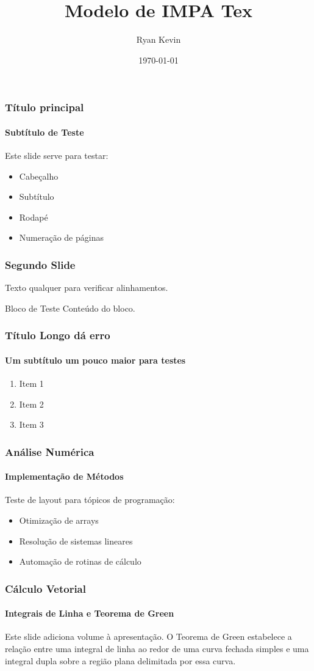 \documentclass[aspectratio=169]{beamer}
\title[IMPA Tex]{Modelo de IMPA Tex}
\author[Ryan Kevin]{Ryan Kevin}
\institute[IMPATECH]{Instituto de Matemática, Pesquisa e Tecnologia}
\date{\today}
\begin{document}
\begin{frame}
    \frametitle{Título principal}
    \framesubtitle{Subtítulo de Teste}

    Este slide serve para testar:

    \begin{itemize}
        \item Cabeçalho
        \item Subtítulo
        \item Rodapé
        \item Numeração de páginas
    \end{itemize}
\end{frame}

\begin{frame}
    \frametitle{Segundo Slide}

    Texto qualquer para verificar alinhamentos.

    \vspace{1cm}

    \begin{block}{Bloco de Teste}
        Conteúdo do bloco.
    \end{block}
\end{frame}

\begin{frame}
    \frametitle{Título Longo dá erro}
    \framesubtitle{Um subtítulo um pouco maior para testes}

    \begin{enumerate}
        \item Item 1
        \item Item 2
        \item Item 3
    \end{enumerate}
\end{frame}

\begin{frame}
    \frametitle{Análise Numérica}
    \framesubtitle{Implementação de Métodos}
    
    Teste de layout para tópicos de programação:
    \begin{itemize}
        \item Otimização de arrays
        \item Resolução de sistemas lineares
        \item Automação de rotinas de cálculo
    \end{itemize}
\end{frame}

\begin{frame}
    \frametitle{Cálculo Vetorial}
    \framesubtitle{Integrais de Linha e Teorema de Green}

    Este slide adiciona volume à apresentação. O Teorema de Green estabelece a relação entre uma integral de linha ao redor de uma curva fechada simples e uma integral dupla sobre a região plana delimitada por essa curva.
\end{frame}
\end{document}
